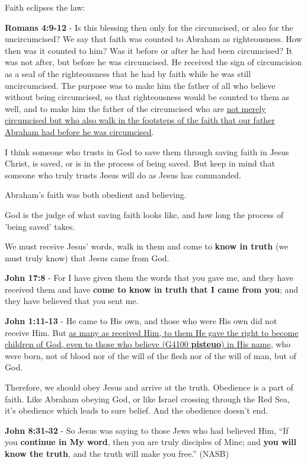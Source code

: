 \documentclass[11pt]{article}
\begin{document}
Faith eclipses the law:

\textbf{Romans 4:9-12} - Is this blessing then only for the circumcised, or also for the uncircumcised? We say that faith was counted to Abraham as righteousness. How then was it counted to him? Was it before or after he had been circumcised? It was not after, but before he was circumcised. He received the sign of circumcision as a seal of the righteousness that he had by faith while he was still uncircumcised. The purpose was to make him the father of all who believe without being circumcised, so that righteousness would be counted to them as well, and to make him the father of the circumcised who are \uline{not merely circumcised but who also walk in the footsteps of the faith that our father Abraham had before he was circumcised}.

I think someone who trusts in God to save them through saving faith in Jesus Christ, is saved, or is in the process of being saved.
But keep in mind that someone who truly trusts Jesus will do as Jesus has commanded.

Abraham's faith was both obedient and believing.

God is the judge of what saving faith looks like, and how long the process of 'being saved' takes.

We must receive Jesus' words, walk in them and come to \textbf{know in truth} (we must truly know) that Jesus came from God.

\textbf{John 17:8} - For I have given them the words that you gave me, and they have received them and have \textbf{come to know in truth that I came from you}; and they have believed that you sent me.

\textbf{John 1:11-13} - He came to His own, and those who were His own did not receive Him. But \uline{as many as received Him, to them He gave the right to become children of God, even to those who believe (G4100 \textbf{pisteuo}) in His name}, who were born, not of blood nor of the will of the flesh nor of the will of man, but of God.

Therefore, we should obey Jesus and arrive at the truth. Obedience is a part of faith. Like Abraham obeying God, or like Israel crossing through the Red Sea, it's obedience which leads to sure belief.
And the obedience doesn't end.

\textbf{John 8:31-32} - So Jesus was saying to those Jews who had believed Him, “If you \textbf{continue in My word}, then you are truly disciples of Mine; and \textbf{you will know the truth}, and the truth will make you free.” (NASB)
\end{document}
